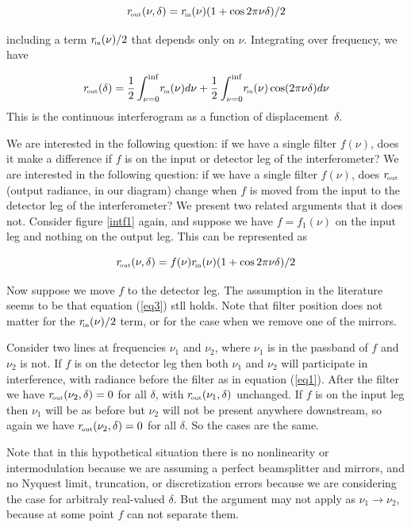 \documentclass[12pt]{article}
\begin{document}
\begin{equation}\label{eq1}
  r_{\!\mbox{\tiny out}}(\nu,\delta) = r_{\!\mbox{\tiny in}}(\nu)(1+\cos 2\pi\nu\delta)/2
\end{equation}

\noindent
including a term $r_{\!\mbox{\tiny in}}(\nu)/2$ that depends only on $\nu$.
Integrating over frequency, we have

\begin{equation}\label{eq2}
  r_{\!\mbox{\tiny out}}(\delta) = \frac{1}{2}\int_{\nu=0}^{\inf}\!r_{\!\mbox{\tiny in}}(\nu)d\nu + 
     \frac{1}{2}\int_{\nu=0}^{\inf}\!r_{\!\mbox{\tiny in}}(\nu)\cos(2\pi\nu\delta)d\nu
\end{equation}
\noindent
This is the continuous interferogram as a function of
displacement~$\delta$.

We are interested in the following question: if we have a single
filter $f(\nu)$, does it make a difference if $f$ is on the input 
or detector leg of the interferometer?  We are interested in the
following question: if we have a single filter $f(\nu)$, does
$r_{\!\mbox{\tiny out}}$ (output radiance, in our diagram) change when $f$ is moved
from the input to the detector leg of the interferometer?
We present two related arguments that it does not.  Consider figure
\ref{intf1} again, and suppose we have $f = f_1(\nu)$ on the input
leg and nothing on the output leg.  This can be represented as

\begin{equation}\label{eq3}
  r_{\!\mbox{\tiny out}}(\nu,\delta) = f(\nu)r_{\!\mbox{\tiny in}}(\nu)(1+\cos 2\pi\nu\delta)/2
\end{equation}

Now suppose we move $f$ to the detector leg.  The assumption in the
literature seems to be that equation (\ref{eq3}) stll holds.  Note
that filter position does not matter for the $r_{\!\mbox{\tiny in}}(\nu)/2$ term, or
for the case when we remove one of the mirrors.

Consider two lines at frequencies $\nu_1$ and $\nu_2$, where $\nu_1$
is in the passband of $f$ and $\nu_2$ is not.  If $f$ is on the
detector leg then both $\nu_1$ and $\nu_2$ will participate in
interference, with radiance before the filter as in equation
(\ref{eq1}).  After the filter we have $r_{\!\mbox{\tiny out}}(\nu_2,\delta) = 0$ for
all $\delta$, with $r_{\!\mbox{\tiny out}}(\nu_1,\delta)$ unchanged.  If $f$ is on
the input leg then $\nu_1$ will be as before but $\nu_2$ will not be
present anywhere downstream, so again we have $r_{\!\mbox{\tiny out}}(\nu_2,\delta) =
0$ for all $\delta$.  So the cases are the same.

Note that in this hypothetical situation there is no nonlinearity or
intermodulation because we are assuming a perfect beamsplitter and
mirrors, and no Nyquest limit, truncation, or discretization errors
because we are considering the case for arbitraly real-valued
$\delta$.  But the argument may not apply as $\nu_1 \rightarrow
\nu_2$, because at some point $f$ can not separate them.
\end{document}
